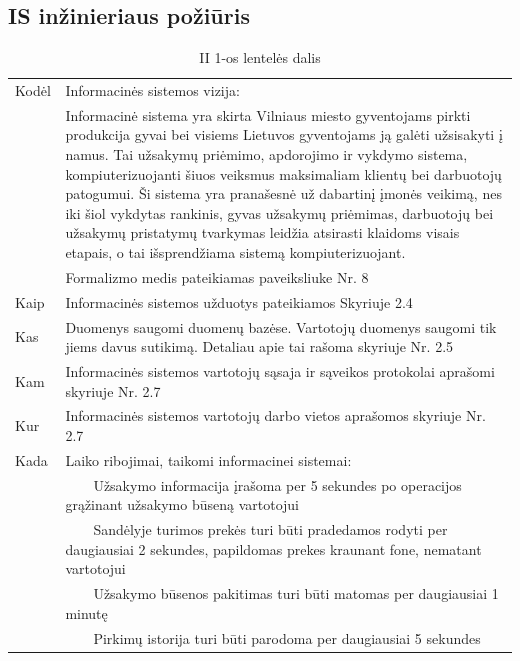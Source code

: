 \documentclass{VUMIFPSkursinis}
\newcommand{\tabitem}{~~\llap{\textbullet}~~}
\begin{document}
\subsection{IS inžinieriaus požiūris}
\begin{center}
\begin{table}[ht]
\centering
	\caption{II 1-os lentelės dalis}
	\begin{tabular}{| p{0.1\linewidth} | p{0.9\linewidth }|} 
	\hline
	Kodėl  & Informacinės sistemos vizija:\\
            &    Informacinė sistema yra skirta Vilniaus miesto gyventojams pirkti produkcija gyvai bei visiems Lietuvos gyventojams ją galėti užsisakyti į namus. Tai užsakymų priėmimo, apdorojimo ir vykdymo sistema, kompiuterizuojanti šiuos veiksmus maksimaliam klientų bei darbuotojų patogumui. Ši sistema yra pranašesnė už dabartinį įmonės veikimą, nes iki šiol vykdytas rankinis, gyvas užsakymų priėmimas, darbuotojų bei užsakymų pristatymų tvarkymas leidžia atsirasti klaidoms visais etapais, o tai išsprendžiama sistemą kompiuterizuojant.\\
             &   Formalizmo medis pateikiamas paveiksliuke Nr. 8 \\ \hline
	Kaip 	& Informacinės sistemos užduotys pateikiamos Skyriuje 2.4 \\ \hline
	Kas 	& Duomenys saugomi duomenų bazėse. Vartotojų duomenys saugomi tik jiems davus sutikimą. Detaliau apie tai rašoma skyriuje Nr. 2.5  \\ \hline
	Kam 	& Informacinės sistemos vartotojų sąsaja ir sąveikos protokolai aprašomi skyriuje Nr. 2.7 \\ \hline
	Kur 	& Informacinės sistemos vartotojų darbo vietos aprašomos skyriuje Nr. 2.7 \\ \hline
	Kada 	& Laiko ribojimai, taikomi informacinei sistemai: \\
		    &\hspace{4mm}\tabitem Užsakymo informacija įrašoma per 5 sekundes po operacijos grąžinant užsakymo būseną vartotojui \\
		    &\hspace{4mm}\tabitem Sandėlyje turimos prekės turi būti pradedamos rodyti per daugiausiai 2 sekundes, papildomas prekes kraunant fone, nematant vartotojui \\
		    &\hspace{4mm}\tabitem Užsakymo būsenos pakitimas turi būti matomas per daugiausiai 1 minutę \\
		    &\hspace{4mm}\tabitem Pirkimų istorija turi būti parodoma per daugiausiai 5 sekundes \\

\end{tabular}
\end{table}
\end{center}
\end{document}
